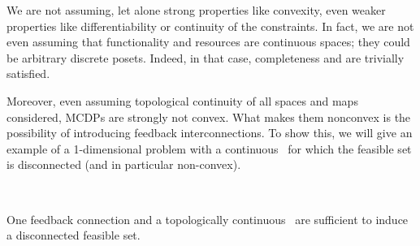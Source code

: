 We are not assuming, let alone strong properties like convexity, even
weaker properties like differentiability or continuity of the constraints.
In fact, we are not even assuming that functionality and resources
are continuous spaces; they could be arbitrary discrete posets.
Indeed, in that case, completeness and \scottcontinuity are trivially satisfied.


Moreover, even assuming topological continuity of all spaces and maps
considered, MCDPs are strongly not convex. What makes them nonconvex
is the possibility of introducing feedback interconnections. To show
this, we will give an example of a 1-dimensional problem with a continuous~\ftor
for which the feasible set is disconnected (and in particular non-convex).

\begin{marginfigure}
    \centering
    \\
    \caption{One feedback connection and a topologically continuous~\ftor
    are sufficient to induce a disconnected feasible set.}
    \label{fig:ceil-1}
\end{marginfigure}


